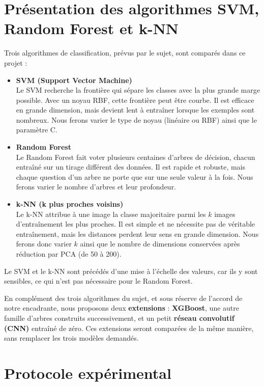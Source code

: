 \section{Présentation des algorithmes SVM, Random Forest et k-NN}

Trois algorithmes de classification, prévus par le sujet, sont comparés dans ce projet :

\begin{itemize}
  \item \textbf{SVM (Support Vector Machine)}\\
  Le SVM recherche la frontière qui sépare les classes avec la plus grande marge possible. Avec un noyau RBF, cette frontière peut être courbe. Il est efficace en grande dimension, mais devient lent à entraîner lorsque les exemples sont nombreux. Nous ferons varier le type de noyau (linéaire ou RBF) ainsi que le paramètre C.
  \item \textbf{Random Forest}\\
  Le Random Forest fait voter plusieurs centaines d'arbres de décision, chacun entraîné sur un tirage différent des données. Il est rapide et robuste, mais chaque question d'un arbre ne porte que sur une seule valeur à la fois. Nous ferons varier le nombre d'arbres et leur profondeur.
  \item \textbf{k-NN (k plus proches voisins)}\\
  Le k-NN attribue à une image la classe majoritaire parmi les $k$ images d'entraînement les plus proches. Il est simple et ne nécessite pas de véritable entraînement, mais les distances perdent leur sens en grande dimension. Nous ferons donc varier $k$ ainsi que le nombre de dimensions conservées après réduction par PCA (de 50 à 200).
\end{itemize}

Le SVM et le k-NN sont précédés d'une mise à l'échelle des valeurs, car ils y sont sensibles, ce qui n'est pas nécessaire pour le Random Forest.

En complément des trois algorithmes du sujet, et sous réserve de l'accord de notre encadrante, nous proposons deux \textbf{extensions} : \textbf{XGBoost}, une autre famille d'arbres construits successivement, et un petit \textbf{réseau convolutif (CNN)} entraîné de zéro. Ces extensions seront comparées de la même manière, sans remplacer les trois modèles demandés.

\section{Protocole expérimental}

